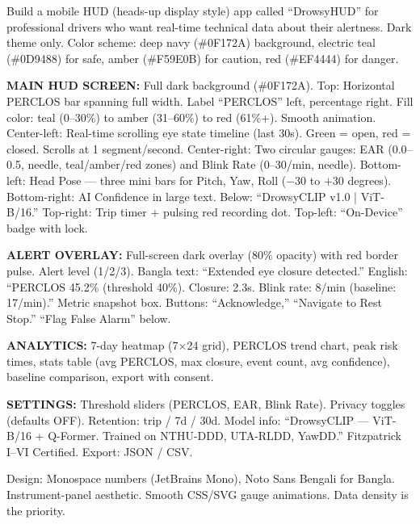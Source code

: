 \documentclass[sigconf]{acmart}
\begin{document}
\begin{promptbox}
Build a mobile HUD (heads-up display style) app called ``DrowsyHUD'' for professional drivers who want real-time technical data about their alertness. Dark theme only. Color scheme: deep navy (\#0F172A) background, electric teal (\#0D9488) for safe, amber (\#F59E0B) for caution, red (\#EF4444) for danger.

\textbf{MAIN HUD SCREEN:} Full dark background (\#0F172A). Top: Horizontal PERCLOS bar spanning full width. Label ``PERCLOS'' left, percentage right. Fill color: teal (0--30\%) to amber (31--60\%) to red (61\%+). Smooth animation. Center-left: Real-time scrolling eye state timeline (last 30s). Green = open, red = closed. Scrolls at 1 segment/second. Center-right: Two circular gauges: EAR (0.0--0.5, needle, teal/amber/red zones) and Blink Rate (0--30/min, needle). Bottom-left: Head Pose --- three mini bars for Pitch, Yaw, Roll ($-30$ to $+30$ degrees). Bottom-right: AI Confidence in large text. Below: ``DrowsyCLIP v1.0 | ViT-B/16.'' Top-right: Trip timer + pulsing red recording dot. Top-left: ``On-Device'' badge with lock.

\textbf{ALERT OVERLAY:} Full-screen dark overlay (80\% opacity) with red border pulse. Alert level (1/2/3). Bangla text: ``Extended eye closure detected.'' English: ``PERCLOS 45.2\% (threshold 40\%). Closure: 2.3s. Blink rate: 8/min (baseline: 17/min).'' Metric snapshot box. Buttons: ``Acknowledge,'' ``Navigate to Rest Stop.'' ``Flag False Alarm'' below.

\textbf{ANALYTICS:} 7-day heatmap (7$\times$24 grid), PERCLOS trend chart, peak risk times, stats table (avg PERCLOS, max closure, event count, avg confidence), baseline comparison, export with consent.

\textbf{SETTINGS:} Threshold sliders (PERCLOS, EAR, Blink Rate). Privacy toggles (defaults OFF). Retention: trip / 7d / 30d. Model info: ``DrowsyCLIP --- ViT-B/16 + Q-Former. Trained on NTHU-DDD, UTA-RLDD, YawDD.'' Fitzpatrick I--VI Certified. Export: JSON / CSV.

Design: Monospace numbers (JetBrains Mono), Noto Sans Bengali for Bangla. Instrument-panel aesthetic. Smooth CSS/SVG gauge animations. Data density is the priority.
\end{promptbox}

\end{document}
